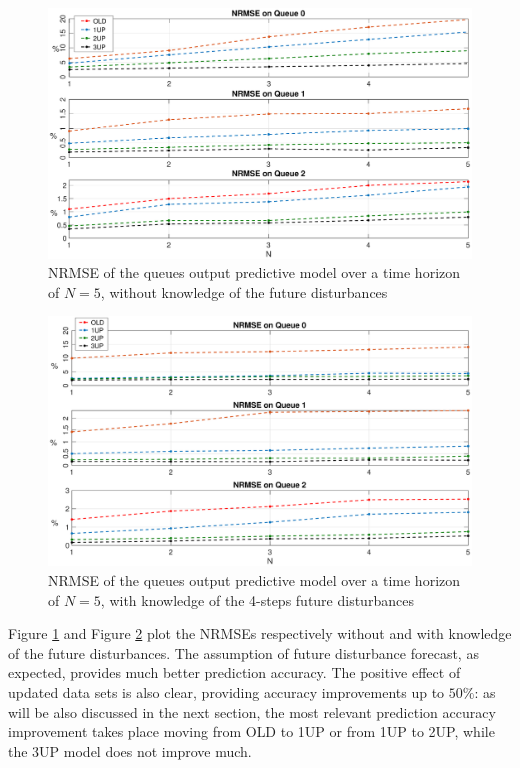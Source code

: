 \begin{figure}[th!]
	\centering
	\includegraphics[trim={120 0 120 0}, width=0.9\linewidth]{figure/Error_State.eps}
	\caption{NRMSE of the queues output predictive model over a time horizon of $N=5$, without knowledge of the future disturbances}
	\label{fig:{stateNRMSE}}
\end{figure}
\begin{figure}[th!]
	\centering
	\includegraphics[trim={120 0 120 0}, width=0.9\linewidth]{figure/Error_State_ddM4.eps}
	\caption{NRMSE of the queues output predictive model over a time horizon of $N=5$, with knowledge of the 4-steps future disturbances}
	\label{fig:{stateNRMSEddM4}}
\end{figure}

Figure \ref{fig:{stateNRMSE}} and Figure \ref{fig:{stateNRMSEddM4}} plot the NRMSEs respectively without and with knowledge of the future disturbances. The assumption of future disturbance forecast, as expected, provides much better prediction accuracy. The positive effect of updated data sets is also clear, providing accuracy improvements up to $50 \%$: as will be also discussed in the next section, the most relevant prediction accuracy improvement takes place moving from OLD to 1UP or from 1UP to 2UP, while the 3UP model does not improve much.

